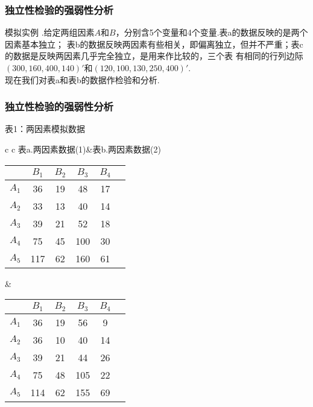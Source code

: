 \begin{frame}\frametitle{\color{blue}独立性检验的强弱性分析}
 \begin{footnotesize}
  \quad\quad 模拟实例 .给定两组因素$A$和$B$，分别含5个变量和4个变量.表a的数据反映的是两个因素基本独立；
表b的数据反映两因素有些相关，即偏离独立，但并不严重；表c的数据是反映两因素几乎完全独立，是用来作比较的，三个表
有相同的行列边际$(300,160,400,140)'$和$(120,100,130,250,400)'$.\\
 \quad\quad 现在我们对表a和表b的数据作检验和分析.
\end{footnotesize}
\end{frame}

\begin{frame}\frametitle{\color{blue}独立性检验的强弱性分析}
 \begin{footnotesize}
 \centering
 表1：两因素模拟数据
\begin{table}[!htbp]
\begin{center}
\begin{tabular}{c c }
表a.\quad 两因素数据(1)&表b.\quad 两因素数据(2)\\
\begin{tabular}{c|c c c c c}                                    \hline
             \quad& $B_{1}$ &$B_{2}$&$B_{3}$ & $B_{4}$               \\\hline
     $A_{1}$\quad&36       &19     &48      &17     \\
      $A_{2}$\quad&33       &13     &40      &14     \\
     $A_{3}$\quad&39       &21     &52      &18        \\
     $A_{4}$\quad&75       &45     &100     &30         \\
      $A_{5}$\quad&117      &62     &160     &61     \\ \hline

\end{tabular}
&
\begin{tabular}{c|c c c c c}                                    \hline
            \quad& $B_{1}$ &$B_{2}$&$B_{3}$ & $B_{4}$               \\\hline
   $A_{1}$\quad&36       &19     &56      &9    \\
    $A_{2}$\quad&36       &10     &40      &14      \\
     $A_{3}$\quad&39       &21     &44      &26        \\
     $A_{4}$\quad&75       &48     &105     &22         \\
    $A_{5}$\quad&114      &62     &155     &69   \\ \hline


\end{tabular}
\end{tabular}
\end{center}
\end{table}
\end{footnotesize}
\end{frame}
